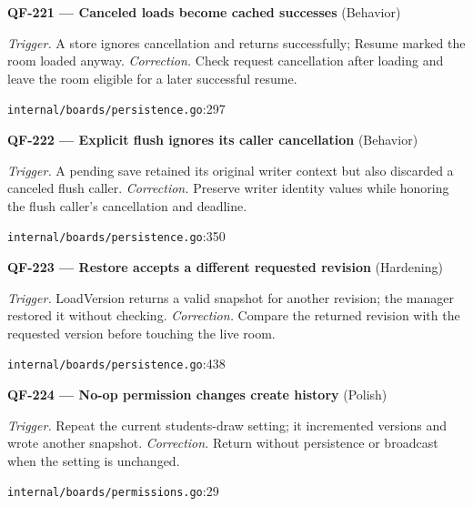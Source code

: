 \begin{minipage}{\linewidth}
\textbf{QF-221 --- Canceled loads become cached successes} {\scriptsize\color{accent}(Behavior)}\par
\textit{Trigger.} A store ignores cancellation and returns successfully; Resume marked the room loaded anyway. \textit{Correction.} Check request cancellation after loading and leave the room eligible for a later successful resume.\par
{\scriptsize\color{muted}\nolinkurl{internal/boards/persistence.go}:297}\par
\end{minipage}\par\vspace{7pt}
\begin{minipage}{\linewidth}
\textbf{QF-222 --- Explicit flush ignores its caller cancellation} {\scriptsize\color{accent}(Behavior)}\par
\textit{Trigger.} A pending save retained its original writer context but also discarded a canceled flush caller. \textit{Correction.} Preserve writer identity values while honoring the flush caller's cancellation and deadline.\par
{\scriptsize\color{muted}\nolinkurl{internal/boards/persistence.go}:350}\par
\end{minipage}\par\vspace{7pt}
\begin{minipage}{\linewidth}
\textbf{QF-223 --- Restore accepts a different requested revision} {\scriptsize\color{accent}(Hardening)}\par
\textit{Trigger.} LoadVersion returns a valid snapshot for another revision; the manager restored it without checking. \textit{Correction.} Compare the returned revision with the requested version before touching the live room.\par
{\scriptsize\color{muted}\nolinkurl{internal/boards/persistence.go}:438}\par
\end{minipage}\par\vspace{7pt}
\begin{minipage}{\linewidth}
\textbf{QF-224 --- No-op permission changes create history} {\scriptsize\color{accent}(Polish)}\par
\textit{Trigger.} Repeat the current students-draw setting; it incremented versions and wrote another snapshot. \textit{Correction.} Return without persistence or broadcast when the setting is unchanged.\par
{\scriptsize\color{muted}\nolinkurl{internal/boards/permissions.go}:29}\par
\end{minipage}\par\vspace{7pt}
